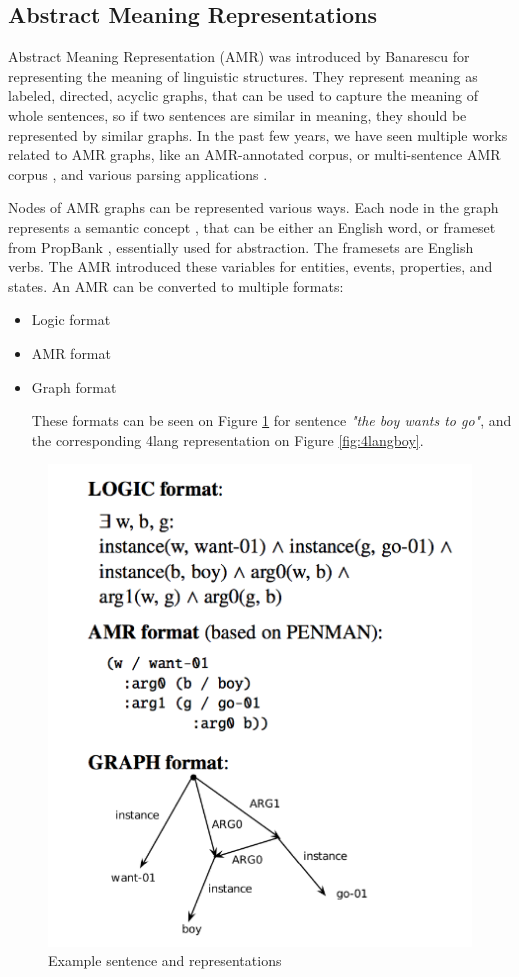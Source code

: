 \subsection{Abstract Meaning Representations}
Abstract Meaning Representation (AMR) was introduced by Banarescu\cite{Banarescu:2013} for representing the meaning of linguistic structures. They represent meaning as labeled, directed, acyclic graphs, that can be used to capture the meaning of whole sentences, so if two sentences are similar in meaning, they should be represented by similar graphs. In the past few years, we have seen multiple works related to AMR graphs, like an AMR-annotated corpus\cite{Banarescu:2013}, or multi-sentence AMR corpus \cite{OGorman2018AMRBT}, and various parsing applications \cite{DAC:2017} \cite{Vanderwende:2015}.

Nodes of AMR graphs can be represented various ways. Each node in the graph represents a semantic concept \cite{AMR:2015}, that can be either an English word, or frameset from PropBank \cite{Palmer:2005}, essentially used for abstraction. The framesets are English verbs. The AMR introduced these variables for entities, events, properties, and states. An AMR can be converted to multiple formats:
\begin{itemize}
	\item Logic format
	\item AMR format
	\item Graph format
	
	These formats can be seen on Figure \ref{fig:amr} for sentence \textit{"the boy wants to go"}, and the corresponding 4lang representation on Figure \ref{fig:4langboy}.
	
\end{itemize}

\begin{figure}[h!]
	\centering
	\includegraphics[height=0.4\textwidth]{figures/amr}
	\caption{Example sentence and representations}
	\label{fig:amr}
\end{figure}


